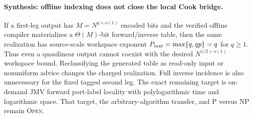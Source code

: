 \paragraph{Synthesis: offline indexing does not close the local Cook bridge.}
If a first-leg output has $M=N^{q+o(1)}$ encoded bits and the verified
offline compiler materializes a $\Theta(M)$-bit forward/inverse table, then
the same realization has source-scale workspace exponent
$P_{\rm mat}=\max\{q,qp\}=q$ for $q\ge1$.  Thus even a quasilinear output
cannot coexist with the desired $N^{1/2+o(1)}$ workspace bound.  Reclassifying
the generated table as read-only input or nonuniform advice changes the
charged realization.  Full inverse incidence is also unnecessary for the
fixed tagged second leg.  The exact remaining target is on-demand JMV
forward port-label locality with polylogarithmic time and logarithmic space.
That target, the arbitrary-algorithm transfer, and P versus NP remain
\textsc{Open}.
